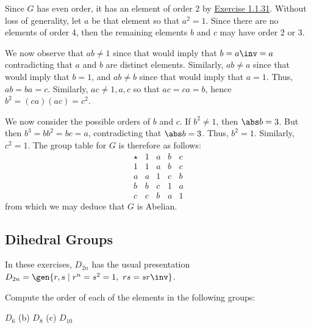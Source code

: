\begin{sol}
    Since $G$ has even order, it has an element of order 2 by \hyperref[ex1.1.31]{Exercise 1.1.31}. Without loss of generality, let $a$ be that element so that $a^2 = 1$. Since there are no elements of order 4, then the remaining elements $b$ and $c$ may have order 2 or 3.

    We now observe that $ab \neq 1$ since that would imply that $b = a\inv = a$ contradicting that $a$ and $b$ are distinct elements. Similarly, $ab \neq a$ since that would imply that $b = 1$, and $ab \neq b$ since that would imply that $a = 1$. Thus, $ab = ba = c$. Similarly, $ac \neq 1, a, c$ so that $ac = ca = b$, hence $b^2 = (ca)(ac) = c^2$.

    We now consider the possible orders of $b$ and $c$. If $b^2 \neq 1$, then $\abs b = 3$. But then $b^3 = b b^2 = b c = a$, contradicting that $\abs b = 3$. Thus, $b^2 = 1$. Similarly, $c^2 = 1$. The group table for $G$ is therefore as follows:
    \[
    \begin{array}{c|cccc}
        \star & 1 & a & b & c \\
        \hline 
        1 & 1 & a & b & c \\
        a & a & 1 & c & b \\
        b & b & c & 1 & a \\
        c & c & b & a & 1
    \end{array}\]
    from which we may deduce that $G$ is Abelian.
\end{sol}

\newpage

\subsection{Dihedral Groups}

In these exercises, $D_{2n}$ has the usual presentation 
$D_{2n} = \gen{r, s \mid r^n = s^2 = 1, \ rs = sr\inv}$.

\begin{exercise} \label{ex1.2.1}
    Compute the order of each of the elements in the following groups:
    \begin{subproblems}
        \item $D_6$ \quad (b) $D_8$ \quad (c) $D_{10}$
    \end{subproblems}
\end{exercise}

